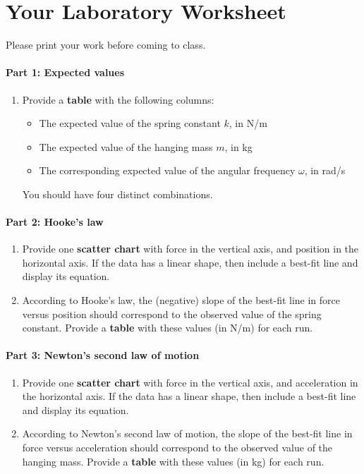 \section{Your Laboratory Worksheet}
%
Please print your work before coming to class.
%
\paragraph{Part 1: Expected values}
%
\begin{enumerate}
    \item Provide a \textbf{table} with the following columns:
    \begin{itemize}
        \item The expected value of the spring constant $k$, in N/m
        \item The expected value of the hanging mass $m$, in kg
        \item The corresponding expected value of the angular frequency $\omega$, in rad/s
    \end{itemize}
    You should have four distinct combinations.
\end{enumerate}
%
\paragraph{Part 2: Hooke's law}
%
\begin{enumerate}
    \item Provide one \textbf{scatter chart} with force in the vertical axis, and position in the horizontal axis. If the data has a linear shape, then include a best-fit line and display its equation.
    \item According to Hooke's law, the (negative) slope of the best-fit line in force versus position should correspond to the observed value of the spring constant. Provide a \textbf{table} with these values (in N/m) for each run.
\end{enumerate}
%
\paragraph{Part 3: Newton's second law of motion}
%
\begin{enumerate}
    \item Provide one \textbf{scatter chart} with force in the vertical axis, and acceleration in the horizontal axis. If the data has a linear shape, then include a best-fit line and display its equation.
    \item According to Newton's second law of motion, the slope of the best-fit line in force versus acceleration should correspond to the observed value of the hanging mass. Provide a \textbf{table} with these values (in kg) for each run.
\end{enumerate}
%
